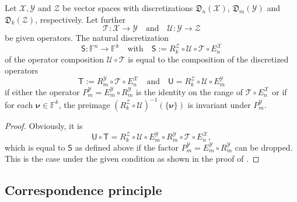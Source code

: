 \documentclass[a4paper]{paper}
\newcommand{\Discr}{\mathfrak{D}}
\newcommand{\Spc}[1]{\mathscr{#1}}
\newcommand{\Field}{\mathbb{F}}
\newcommand{\Op}[1]{\mathcal{#1}}
\newcommand{\DiscOp}[1]{\mathsf{#1}}
\newcommand*{\EXT}[2]{\ensuremath{E_{#1}^{#2}}}
\newcommand*{\REST}[2]{\ensuremath{R_{#1}^{#2}}}
\newcommand*{\PROJ}[2]{\ensuremath{P_{#1}^{#2}}}
\newcommand*{\RmY}{\ensuremath{\REST{m}{\Spc{Y}}}}
\newcommand*{\EnX}{\ensuremath{\EXT{n}{\Spc{X}}}}
\newcommand*{\EmY}{\ensuremath{\EXT{m}{\Spc{Y}}}}
\newcommand*{\PmY}{\ensuremath{\PROJ{m}{\Spc{Y}}}}
\newcommand{\vnu}{\boldsymbol{\nu}}
\begin{document}
\begin{lemma}
 \label{lemma:discr:operator:op_comp:natural_is_comp}
 Let $\Spc{X}, \Spc{Y}$ and $\Spc{Z}$ be vector spaces with discretizations $\Discr_n(\Spc{X})$, 
 $\Discr_m(\Spc{Y})$ and $\Discr_k(\Spc{Z})$, respectively. Let further
 \begin{equation*}
  \Op{T} \colon \Spc{X} \to \Spc{Y} \quad \text{and} \quad \Op{U} \colon \Spc{Y} \to \Spc{Z}
 \end{equation*}
 be given operators. The natural discretization
 \begin{equation*}
  \DiscOp{S} \colon \Field^n \to \Field^k 
  \quad \text{with} \quad
  \DiscOp{S} := \REST{k}{\Spc{Z}} \circ \Op{U} \circ \Op{T} \circ \EnX
 \end{equation*}
 of the operator composition $\Op{U} \circ \Op{T}$ is equal to the composition of the discretized operators
 \begin{equation*}
  \DiscOp{T} := \RmY \circ \Op{T} \circ \EnX
  \quad \text{and} \quad
  \DiscOp{U} = \REST{k}{\Spc{Z}} \circ \Op{U} \circ \EmY
 \end{equation*}
 if either the operator $\PmY = \EmY \circ \RmY$ is the identity on the range of $\Op{T} \circ \EnX$ or if for each 
 $\vnu \in \Field^k$, the preimage $(\REST{k}{\Spc{Z}} \circ \Op{U})^{-1}(\{\vnu\})$ is invariant under 
 $\PmY$.
\end{lemma}
\vspace{1em}


\begin{proof}
 Obviously, it is
 \begin{equation*}
  \DiscOp{U} \circ \DiscOp{T} = \REST{k}{\Spc{Z}} \circ \Op{U} \circ \EmY \circ \RmY \circ \Op{T} \circ \EnX,
 \end{equation*}
 which is equal to $\DiscOp{S}$ as defined above if the factor $\PmY = \EmY \circ \RmY$ can be dropped. This is the 
 case under the given condition as shown in the proof of .
\end{proof}



\subsection{Correspondence principle}
\label{subsec:discr:corresp}
\end{document}

